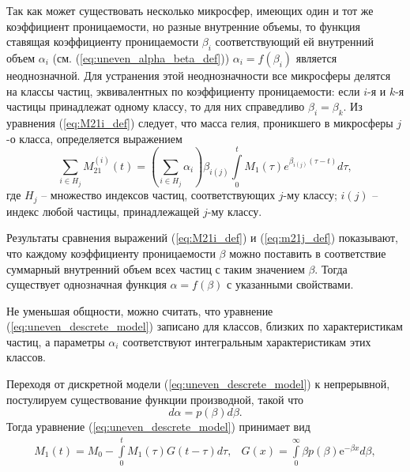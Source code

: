 Так как может существовать несколько микросфер, имеющих один и тот же коэффициент проницаемости, но разные внутренние объемы, то функция ставящая коэффициенту проницаемости $\beta_i$ соответствующий ей внутренний объем $\alpha_i$ (см. (\ref{eq:uneven_alpha_beta_def}))  $\alpha_i = f(\beta_i)$ является неоднозначной. Для устранения этой неоднозначности все микросферы делятся на классы частиц, эквивалентных по коэффициенту проницаемости: если $i$-я и $k$-я частицы принадлежат одному классу, то для них справедливо $\beta_i=\beta_k$. Из уравнения (\ref{eq:M21i_def}) следует, что масса гелия, проникшего в микросферы $j$-о класса, определяется выражением
\begin{equation}
\label{eq:m21j_def}
\sum\limits_{i \in H_j} M_{21}^{(i)}(t) = \left(\sum _{i \in H_j} \alpha_i \right) \beta_{i(j)} \int\limits_{0}^{t}M_1(\tau) e^{\beta_{i(j)} (\tau-t)} d\tau,
\end{equation}
где $H_j$ -- множество индексов частиц, соответствующих $j$-му классу; $i(j)$ -- индекс любой частицы, принадлежащей $j$-му классу.

Результаты сравнения выражений (\ref{eq:M21i_def}) и (\ref{eq:m21j_def}) показывают, что каждому коэффициенту проницаемости $\beta$ можно поставить в соответствие суммарный внутренний объем всех частиц с таким значением $\beta$. Тогда существует однозначная функция $\alpha=f(\beta)$ с указанными свойствами.



Не уменьшая общности, можно считать, что уравнение (\ref{eq:uneven_descrete_model}) записано для классов,  близких по характеристикам частиц, а параметры $\alpha_i$ соответствуют интегральным характеристикам этих классов. 


Переходя от дискретной модели (\ref{eq:uneven_descrete_model}) к непрерывной, постулируем существование функции производной, такой что 
\begin{equation}
\label{eq:uneven_pbeta_def}
d \alpha = p(\beta) d\beta.
\end{equation}
Тогда уравнение (\ref{eq:uneven_descrete_model}) принимает вид
\begin{equation}
\label{eq:uneven_cont_model}
\begin{array}{rl}
M_1(t)=M_0-\int\limits_{0}^{t}  M_1(\tau)  G(t-\tau) d\tau, & 
G(x) = \int\limits_{0}^{\infty}\beta p(\beta)  \mathrm{e}^{-\beta x} d\beta,\\
\end{array}
\end{equation}

